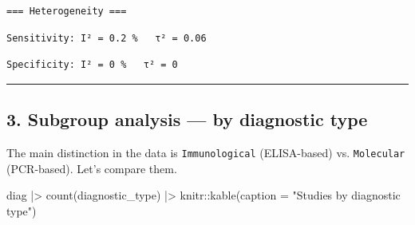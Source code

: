 \documentclass[
  letterpaper,
  DIV=11,
  numbers=noendperiod]{scrartcl}
\newenvironment{Shaded}{\begin{snugshade}}{\end{snugshade}}
\newcommand{\AttributeTok}[1]{\textcolor[rgb]{0.40,0.45,0.13}{#1}}
\newcommand{\DecValTok}[1]{\textcolor[rgb]{0.68,0.00,0.00}{#1}}
\newcommand{\FunctionTok}[1]{\textcolor[rgb]{0.28,0.35,0.67}{#1}}
\newcommand{\NormalTok}[1]{\textcolor[rgb]{0.00,0.23,0.31}{#1}}
\newcommand{\SpecialCharTok}[1]{\textcolor[rgb]{0.37,0.37,0.37}{#1}}
\newcommand{\StringTok}[1]{\textcolor[rgb]{0.13,0.47,0.30}{#1}}
\begin{document}
\begin{verbatim}
=== Heterogeneity ===
\end{verbatim}

\begin{Shaded}
\end{Shaded}

\begin{verbatim}
Sensitivity: I² = 0.2 %   τ² = 0.06 
\end{verbatim}

\begin{Shaded}
\end{Shaded}

\begin{verbatim}
Specificity: I² = 0 %   τ² = 0 
\end{verbatim}

\begin{center}\rule{0.5\linewidth}{0.5pt}\end{center}

\subsection{3. Subgroup analysis --- by diagnostic
type}\label{subgroup-analysis-by-diagnostic-type}

The main distinction in the data is \texttt{Immunological} (ELISA-based)
vs. \texttt{Molecular} (PCR-based). Let's compare them.

\begin{Shaded}
\begin{Highlighting}[]
\NormalTok{diag }\SpecialCharTok{|\textgreater{}}
  \FunctionTok{count}\NormalTok{(diagnostic\_type) }\SpecialCharTok{|\textgreater{}}
\NormalTok{  knitr}\SpecialCharTok{::}\FunctionTok{kable}\NormalTok{(}\AttributeTok{caption =} \StringTok{"Studies by diagnostic type"}\NormalTok{)}
\end{Highlighting}
\end{Shaded}
\end{document}
